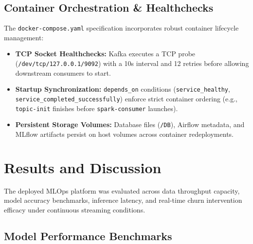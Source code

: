 \documentclass[11pt,a4paper]{article}
\begin{document}
\subsection{Container Orchestration \& Healthchecks}
The \texttt{docker-compose.yaml} specification incorporates robust container lifecycle management:
\begin{itemize}
    \item \textbf{TCP Socket Healthchecks:} Kafka executes a TCP probe (\texttt{/dev/tcp/127.0.0.1/9092}) with a 10s interval and 12 retries before allowing downstream consumers to start.
    \item \textbf{Startup Synchronization:} \texttt{depends\_on} conditions (\texttt{service\_healthy}, \texttt{service\_completed\_successfully}) enforce strict container ordering (e.g., \texttt{topic-init} finishes before \texttt{spark-consumer} launches).
    \item \textbf{Persistent Storage Volumes:} Database files (\texttt{/DB}), Airflow metadata, and MLflow artifacts persist on host volumes across container redeployments.
\end{itemize}

\section{Results and Discussion}

The deployed MLOps platform was evaluated across data throughput capacity, model accuracy benchmarks, inference latency, and real-time churn intervention efficacy under continuous streaming conditions.

\subsection{Model Performance Benchmarks}
\end{document}
